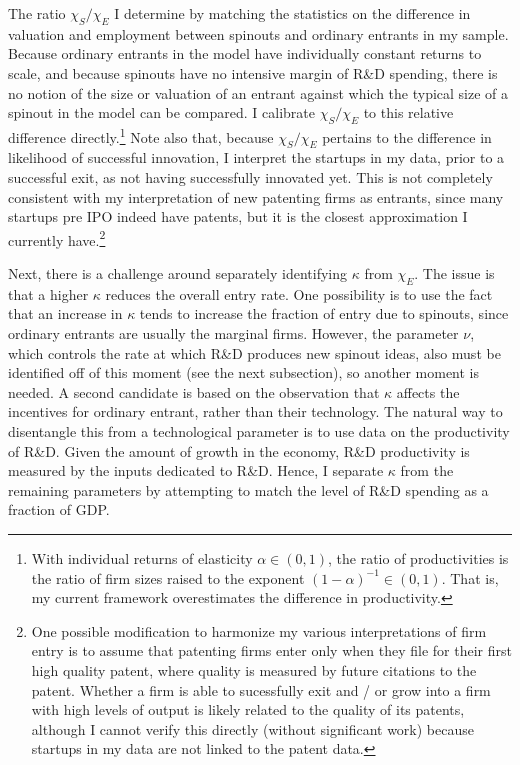 \documentclass[12pt,english]{article}
\theoremstyle{remark}
\begin{document}
The ratio $\chi_S / \chi_E$ I determine by matching the statistics on the difference in valuation and employment between spinouts and ordinary entrants in my sample. Because ordinary entrants in the model have individually constant returns to scale, and because spinouts have no intensive margin of R\&D spending, there is no notion of the size or valuation of an entrant against which the typical size of a spinout in the model can be compared. I calibrate $\chi_S / \chi_E$ to this relative difference directly.\footnote{With individual returns of elasticity $\alpha \in (0,1)$, the ratio of productivities is the ratio of firm sizes raised to the exponent $(1-\alpha)^{-1} \in (0,1)$. That is, my current framework overestimates the difference in productivity.} Note also that, because $\chi_S / \chi_E$ pertains to the difference in likelihood of successful innovation, I interpret the startups in my data, prior to a successful exit, as not having successfully innovated yet. This is not completely consistent with my interpretation of new patenting firms as entrants, since many startups pre IPO indeed have patents, but it is the closest approximation I currently have.\footnote{One possible modification to harmonize my various interpretations of firm entry is to assume that patenting firms enter only when they file for their first high quality patent, where quality is measured by future citations to the patent. Whether a firm is able to sucessfully exit and / or grow into a firm with high levels of output is likely related to the quality of its patents, although I cannot verify this directly (without significant work) because startups in my data are not linked to the patent data.}

Next, there is a challenge around separately identifying $\kappa$ from $\chi_E$. The issue is that a higher $\kappa$ reduces the overall entry rate. One possibility is to use the fact that an increase in $\kappa$ tends to increase the fraction of entry due to spinouts, since ordinary entrants are usually the marginal firms. However, the parameter $\nu$, which controls the rate at which R\&D produces new spinout ideas, also must be identified off of this moment (see the next subsection), so another moment is needed. A second candidate is based on the observation that $\kappa$ affects the incentives for ordinary entrant, rather than their technology. The natural way to disentangle this from a technological parameter is to use data on the productivity of R\&D. Given the amount of growth in the economy, R\&D productivity is measured by the inputs dedicated to R\&D. Hence, I separate $\kappa$ from the remaining parameters by attempting to match the level of R\&D spending as a fraction of GDP. 
\end{document}
